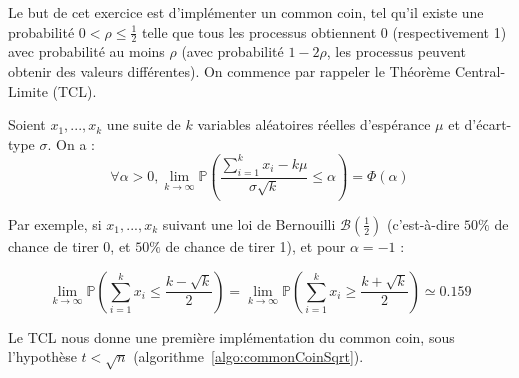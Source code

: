 
\begingroup

\begin{exercice}
  
  Le but de cet exercice est d'implémenter un common coin, tel qu'il existe une probabilité $0 < \rho \le \frac{1}{2}$ telle que tous les processus
  obtiennent $0$ (respectivement 1) avec probabilité au moins $\rho$ (avec probabilité $1-2 \rho$, les processus peuvent obtenir des valeurs différentes).
  On commence par rappeler le Théorème Central-Limite (TCL). 
  
  \begin{theorem}
    Soient $x_1, ..., x_k$ une suite de $k$ variables aléatoires réelles d'espérance $\mu$ et d'écart-type $\sigma$. On a :
    $$\forall \alpha>0,  \lim_{k \to \infty}\mathbb P\left(\frac{\sum_{i=1}^k x_i - k \mu}{\sigma\sqrt{k}}\leq \alpha\right)  =  \Phi(\alpha)$$

    Par exemple, si $x_1, ..., x_k$ suivant une loi de Bernouilli $\mathcal{B}\left(\frac{1}{2}\right)$ (c'est-à-dire $50\%$ de chance de tirer 0, et $50\%$ de chance de tirer 1), et pour $\alpha = -1$ :
    
    $$\lim_{k \to \infty}\mathbb{P}\left( \sum_{i=1}^k x_i\leq \frac{k - \sqrt{k}}{2 } \right) = \lim_{k \to \infty}\mathbb{P}\left( \sum_{i=1}^k x_i \geq \frac{k + \sqrt{k}}{2 } \right) \simeq 0.159$$
  \end{theorem}

  Le TCL nous donne une première implémentation du common coin, sous l'hypothèse $t<\sqrt{n}$ (algorithme~\ref{algo:commonCoinSqrt}).
  
  \begin{algorithm}
    \caption{Common coin dans le modèle $CAMP_{n,t}[\texttt{local\_coin}, rb-broadcast, t<\sqrt{n}]$}
    \label{algo:commonCoinSqrt}
  \end{algorithm}


\end{exercice}
